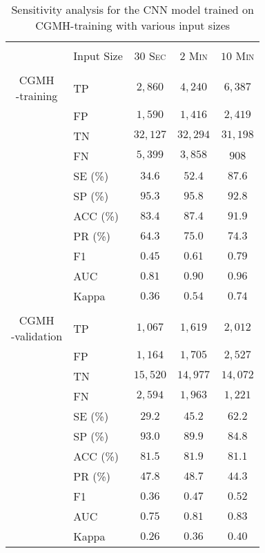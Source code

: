 \documentclass[10pt,a4paper,english]{amsart}
\begin{document}
\begin{table}
\caption{Sensitivity analysis for the CNN model trained on CGMH-training with various input sizes}
\label{Table:1}
\begin{center}
\begin{small}
\begin{tabular}{c|lccc}
\hline\\ [-0.7em]
 & Input Size & \textsc{$30$ Sec} & \textsc{$2$ Min}  & \textsc{$10$ Min}\\ [0.2em]
\hline \\ [-0.6em]  \multirowcell{11}{CGMH\\-training}
&TP   & $2,860$ & $4,240$ &  $6,387$ \\
&FP  & $1,590$ & $1,416$ & $2,419$ \\
&TN   & $32,127$ & $32,294$  & $31,198$\\
&FN  & $5,399$ & $3,858$ &  $908$\\[0.6em]
&SE (\%)  & $34.6$ & $52.4$ &   $87.6$\\
&SP (\%) & $95.3$ & $95.8$ &   $92.8$\\
&ACC (\%)   & $83.4$ & $87.4$ &   $91.9$ \\[0.6em]
&PR (\%)  & $64.3$ & $75.0$ &   $74.3$\\
&F1    & $0.45$ & $0.61$ &   $0.79$\\
&AUC        & $0.81$ & $0.90$  &  $0.96$\\
&Kappa      & $0.36$ & $0.54$ &   $0.74$ \\[0.2em]
\hline\\ [-0.6em] \multirowcell{11}{CGMH\\-validation}
&TP  & $1,067$ & $1,619$     & $2,012$ \\
&FP  & $1,164$ & $1,705$   & $2,527$ \\
&TN   & $15,520$ & $14,977$     & $14,072$\\
&FN  & $2,594$ & $1,963$  & $1,221$\\[0.6em]
&SE (\%) & $29.2$ & $45.2$ &  $62.2$\\
&SP (\%) & $93.0$ & $89.9$ &  $84.8$\\
&ACC (\%)   & $81.5$ & $81.9$ &  $81.1$ \\[0.6em]
&PR (\%)  & $47.8$ & $48.7$ &  $44.3$\\
&F1    & $0.36$ & $0.47$ &  $0.52$\\
&AUC        & $0.75$ & $0.81$ &  $0.83$\\
&Kappa      & $0.26$ & $0.36$ &  $0.40$ \\

\end{tabular}
\end{small}
\end{center}
\end{table}
\end{document}
